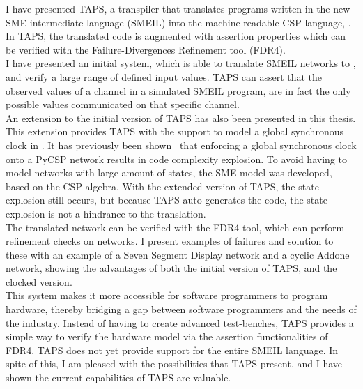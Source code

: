 I have presented TAPS, a transpiler that translates programs written in the
new SME intermediate language (SMEIL) into the machine-readable CSP language,
\cspm{}. In TAPS, the translated \cspm{} code is augmented with assertion
properties which can be verified with the Failure-Divergences Refinement tool
(FDR4).\\
I have presented an initial system, which is able to translate SMEIL networks to
\cspm{}, and verify a large range of defined input values. TAPS can assert that
the observed values of a channel in a simulated SMEIL program, are in fact the
only possible values communicated on that specific channel. \\

An extension to the initial version of TAPS has also been presented in this
thesis. This extension provides TAPS with the support to model a global
synchronous clock in \cspm{}. It has previously been shown~\cite{Skaarup14}
that enforcing a global synchronous clock onto a PyCSP network results in code complexity explosion. To avoid having to model networks with large amount of
states, the SME model was developed, based on the CSP algebra. With the
extended version of TAPS, the state explosion still occurs, but because TAPS auto-generates the \cspm{} code, the state explosion is not a hindrance to the
translation.\\

The translated \cspm{} network can be verified with the FDR4 tool, which can
perform refinement checks on \cspm{} networks. I present examples of failures
and solution to these with an example of a Seven Segment Display network and a
cyclic Addone network, showing the advantages of both the initial version of TAPS, and the clocked version.\\

This system makes it more accessible for software programmers to program
hardware, thereby bridging a gap between software programmers and the needs
of the industry.
Instead of having to create advanced test-benches, TAPS provides a simple
way to verify the hardware model via the assertion functionalities of FDR4.
TAPS does not yet provide support for the entire SMEIL language. In spite of this,
I am pleased with the possibilities that TAPS present, and I have shown the current capabilities of TAPS are valuable.



